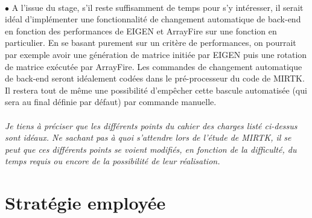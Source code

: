\documentclass[10pt]{report}
\begin{document}
		\\{$\bullet$} A l'issue du stage, s'il reste suffisamment de temps pour s'y intéresser, il serait idéal d'implémenter une fonctionnalité de changement automatique de back-end en fonction des performances de EIGEN et ArrayFire sur une fonction en particulier. En se basant purement sur un critère de performances, on pourrait par exemple avoir une génération de matrice initiée par EIGEN puis une rotation de matrice exécutée par ArrayFire. Les commandes de changement automatique de back-end seront idéalement codées dans le pré-processeur du code de MIRTK. Il restera tout de même une possibilité d'empêcher cette bascule automatisée (qui sera au final définie par défaut) par commande manuelle.
	\\
	\\
	\textit{Je tiens à préciser que les différents points du cahier des charges listé ci-dessus sont idéaux. Ne sachant pas à quoi s'attendre lors de l'étude de MIRTK, il se peut que ces différents points se voient modifiés, en fonction de la difficulté, du temps requis ou encore de la possibilité de leur réalisation.} 
	\section{Stratégie employée}
\end{document}
